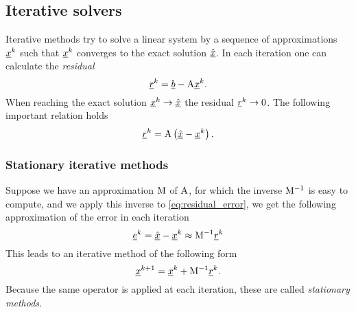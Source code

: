 \subsection{Iterative solvers}
Iterative methods try to solve a linear system by a sequence
of approximations $\underline{x}^k$ such that $\underline{x}^k$ converges to
the exact solution $\underline{\hat x}$. In each iteration one can
calculate the \emph{residual}
\begin{equation*}
  \underline{r}^k = \underline{b} - \mathrm{A}\underline{x}^k.
\end{equation*}
When reaching the exact solution $\underline{x}^k\to\underline{\hat x}$ the
residual $\underline{r}^k\to 0$. The following important relation holds
\begin{equation}\label{eq:residual_error}
  \underline{r}^k = \mathrm{A}\left( \underline{\hat x} - \underline{x}^k \right).
\end{equation}

\subsubsection{Stationary iterative methods} \label{sec:stationary_iterative_methods}
Suppose we have an approximation $\mathrm{M}$ of $\mathrm{A}$, for which
the inverse $\mathrm{M}^{-1}$ is easy to compute, and we apply this inverse
to \eqref{eq:residual_error}, we get the following approximation of the
error in each iteration
\begin{equation}
  \underline{e}^k=\underline{\hat x}-\underline{x}^k \approx \mathrm{M}^{-1}\underline{r}^k
    \label{eq:iterative_solver_error_estimate}
\end{equation}
This leads to an iterative method of the following form
\begin{equation}\label{eq:stationary_iterative_methods}
  \underline{x}^{k+1}=\underline{x}^{k} + \mathrm{M}^{-1} \underline{r}^{k}.
\end{equation}
Because the same operator is applied at each iteration, these are
called \emph{stationary methods}.

